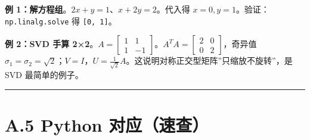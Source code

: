 \textbf{例 1：解方程组}。\(2x+y=1\)、\(x+2y=2\)。代入得
\(x=0, y=1\)。验证：\texttt{np.linalg.solve} 得 \texttt{{[}0,\ 1{]}}。

\textbf{例 2：SVD 手算
2×2}。\(A=\begin{bmatrix}1&1\\1&-1\end{bmatrix}\)。\(A^TA=\begin{bmatrix}2&0\\0&2\end{bmatrix}\)，奇异值
\(\sigma_1=\sigma_2=\sqrt{2}\)；\(V=I\)，\(U=\frac{1}{\sqrt2}A\)。这说明对称正交型矩阵''只缩放不旋转''，是
SVD 最简单的例子。

\begin{Shaded}
\begin{Highlighting}[]
\OperatorTok{=}\NormalTok{ np.array([[}\NormalTok{, }\NormalTok{], [}\NormalTok{, }\OperatorTok{{-}}\NormalTok{]])}
\OperatorTok{=}\OperatorTok{=}\NormalTok{)}
\end{Highlighting}
\end{Shaded}

\begin{center}\rule{0.5\linewidth}{0.5pt}\end{center}

\section{A.5 Python
对应（速查）}\label{a.5-python-ux5bf9ux5e94ux901fux67e5}

